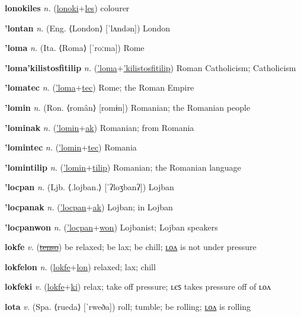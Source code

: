 \textbf{\hypertarget{lonokiles}{lonokiles}} \textit{n.} (\hyperlink{lonoki}{lonoki}+\allowbreak \hyperlink{les}{les})
colourer

\textbf{\hypertarget{'lontan}{'lontan}} \textit{n.} (Eng. ⟨London⟩ [ˈlʌndən])
London

\textbf{\hypertarget{'loma}{'loma}} \textit{n.} (Ita. ⟨Roma⟩ [ˈroːma])
Rome

\textbf{\hypertarget{'loma'kilistosfitilip}{'loma'kilistosfitilip}} \textit{n.} (\hyperlink{'loma}{'loma}+\allowbreak \hyperlink{'kilistosfitilip}{'kilistosfitilip})
Roman Catholicism; Catholicism

\textbf{\hypertarget{'lomatec}{'lomatec}} \textit{n.} (\hyperlink{'loma}{'loma}+\allowbreak \hyperlink{tec}{tec})
Rome; the Roman Empire

\textbf{\hypertarget{'lomin}{'lomin}} \textit{n.} (Ron. ⟨român⟩ [romɨn])
Romanian; the Romanian people

\textbf{\hypertarget{'lominak}{'lominak}} \textit{n.} (\hyperlink{'lomin}{'lomin}+\allowbreak \hyperlink{ak}{ak})
Romanian; from Romania

\textbf{\hypertarget{'lomintec}{'lomintec}} \textit{n.} (\hyperlink{'lomin}{'lomin}+\allowbreak \hyperlink{tec}{tec})
Romania

\textbf{\hypertarget{'lomintilip}{'lomintilip}} \textit{n.} (\hyperlink{'lomin}{'lomin}+\allowbreak \hyperlink{tilip}{tilip})
Romanian; the Romanian language

\textbf{\hypertarget{'locpan}{'locpan}} \textit{n.} (Ljb. ⟨.lojban.⟩ [ˈʔloʒbanʔ])
Lojban

\textbf{\hypertarget{'locpanak}{'locpanak}} \textit{n.} (\hyperlink{'locpan}{'locpan}+\allowbreak \hyperlink{ak}{ak})
Lojban; in Lojban

\textbf{\hypertarget{'locpanwon}{'locpanwon}} \textit{n.} (\hyperlink{'locpan}{'locpan}+\allowbreak \hyperlink{won}{won})
Lojbanist; Lojban speakers

\textbf{\hypertarget{lokfe}{lokfe}} \textit{v.} (\hyperlink{tenso}{\sout{tenso}})
be relaxed; be lax; be chill; \hyperlink{lokfelon}{ʟᴏᴧ} is not under pressure

\textbf{\hypertarget{lokfelon}{lokfelon}} \textit{n.} (\hyperlink{lokfe}{lokfe}+\allowbreak \hyperlink{lon}{lon})
relaxed; lax; chill

\textbf{\hypertarget{lokfeki}{lokfeki}} \textit{v.} (\hyperlink{lokfe}{lokfe}+\allowbreak \hyperlink{ki}{ki})
relax; take off pressure; ʟєꜱ takes pressure off of ʟᴏᴧ

\textbf{\hypertarget{lota}{lota}} \textit{v.} (Spa. ⟨rueda⟩ [ˈrweða])
roll; tumble; be rolling; \hyperlink{lotalon}{ʟᴏᴧ} is rolling

